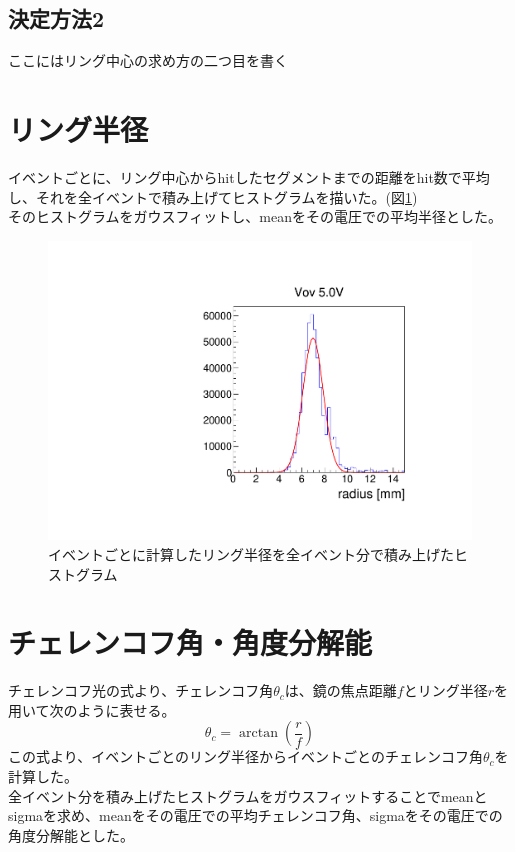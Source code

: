 \documentclass[uplatex, titlepage, dvipdfmx, 12pt, a4paper]{jsreport}
\begin{document}
    \subsection{決定方法2}
      ここにはリング中心の求め方の二つ目を書く
    \section{リング半径}
    イベントごとに、リング中心からhitしたセグメントまでの距離をhit数で平均し、それを全イベントで積み上げてヒストグラムを描いた。(図\ref{fig:5Vradius})\\
    そのヒストグラムをガウスフィットし、meanをその電圧での平均半径とした。
    \begin{figure}[h]
      \begin{center} 
        \includegraphics[scale=0.5, clip]{image/radius.pdf}
        \caption{イベントごとに計算したリング半径を全イベント分で積み上げたヒストグラム} 
        \label{fig:5Vradius} 
      \end{center}
    \end{figure}
    
    
    
    \section{チェレンコフ角・角度分解能}
      チェレンコフ光の式より、チェレンコフ角$\theta_{c}$は、鏡の焦点距離$f$とリング半径$r$を用いて次のように表せる。
      \begin{equation}
        \theta_{c} = \arctan \left(\frac{r}{f} \right)
        \label{theta_radius}
      \end{equation}
      この式より、イベントごとのリング半径からイベントごとのチェレンコフ角$\theta_{c}$を計算した。\\
      全イベント分を積み上げたヒストグラムをガウスフィットすることでmeanとsigmaを求め、meanをその電圧での平均チェレンコフ角、sigmaをその電圧での角度分解能とした。
\end{document}
